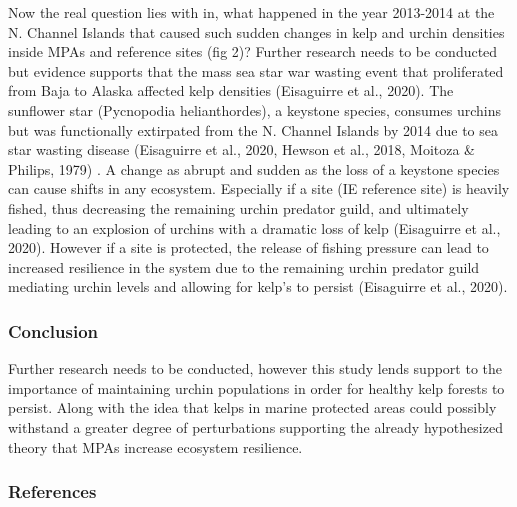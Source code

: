 \documentclass[
]{article}
\begin{document}
Now the real question lies with in, what happened in the year 2013-2014
at the N. Channel Islands that caused such sudden changes in kelp and
urchin densities inside MPAs and reference sites (fig 2)? Further
research needs to be conducted but evidence supports that the mass sea
star war wasting event that proliferated from Baja to Alaska affected
kelp densities (Eisaguirre et al., 2020). The sunflower star (Pycnopodia
helianthordes), a keystone species, consumes urchins but was
functionally extirpated from the N. Channel Islands by 2014 due to sea
star wasting disease (Eisaguirre et al., 2020, Hewson et al., 2018,
Moitoza \& Philips, 1979) . A change as abrupt and sudden as the loss of
a keystone species can cause shifts in any ecosystem. Especially if a
site (IE reference site) is heavily fished, thus decreasing the
remaining urchin predator guild, and ultimately leading to an explosion
of urchins with a dramatic loss of kelp (Eisaguirre et al., 2020).
However if a site is protected, the release of fishing pressure can lead
to increased resilience in the system due to the remaining urchin
predator guild mediating urchin levels and allowing for kelp's to
persist (Eisaguirre et al., 2020).

\hypertarget{conclusion}{%
\subsubsection{Conclusion}\label{conclusion}}

Further research needs to be conducted, however this study lends support
to the importance of maintaining urchin populations in order for healthy
kelp forests to persist. Along with the idea that kelps in marine
protected areas could possibly withstand a greater degree of
perturbations supporting the already hypothesized theory that MPAs
increase ecosystem resilience.

\hypertarget{references}{%
\subsubsection{References}\label{references}}
\end{document}
